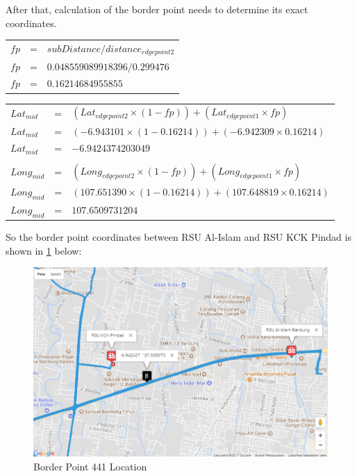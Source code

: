 After that, calculation of the border point needs to determine its exact coordinates.

\begin{table}[H] 
\begin{tabular}{lll}
$fp$ & = & $subDistance / distance_{edgepoint2}$ \\
$fp$ & = & $0.048559089918396 / 0.299476$ \\
$fp$ & = & $0.16214684955855$ \\
\end{tabular}
\end{table}

\begin{table}[H] 
\begin{tabular}{lll}
$Lat_{mid}$ & = & $(Lat_{edgepoint2} \times (1-fp)) + (Lat_{edgepoint1} \times fp)$ \\
$Lat_{mid}$ & = & $(-6.943101 \times (1-0.16214)) + (-6.942309 \times 0.16214)$ \\
$Lat_{mid}$ & = & $-6.9424374203049$ \\
 & & \\
$Long_{mid}$ & = & $(Long_{edgepoint2} \times (1-fp)) + (Long_{edgepoint1} \times fp)$ \\
$Long_{mid}$ & = & $(107.651390 \times (1-0.16214)) + (107.648819 \times 0.16214)$ \\
$Long_{mid}$ & = & $107.6509731204$ \\
\end{tabular}
\end{table}

So the border point coordinates between RSU Al-Islam and RSU KCK Pindad is shown in \ref{fig:rsu_border_point} below:

\begin{figure}[H]
    \centering
    \includegraphics[scale=0.55]{data_proc_1_3.png}
    \caption{Border Point 441 Location}
    \label{fig:rsu_border_point}
\end{figure}

